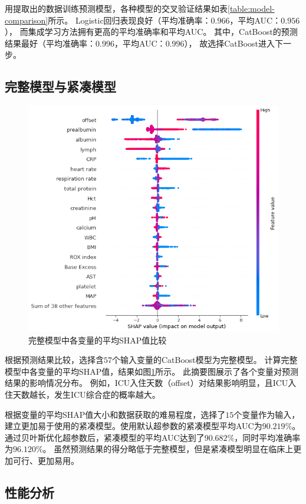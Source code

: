 用提取出的数据训练预测模型，各种模型的交叉验证结果如表\ref{table:model-comparison}所示。%
Logistic回归表现良好（平均准确率：$0.966$，平均AUC：$0.956$），%
而集成学习方法拥有更高的平均准确率和平均AUC。%
其中，CatBoost的预测结果最好（平均准确率：$0.996$，平均AUC：$0.996$），%
故选择CatBoost进入下一步。

\subsection{完整模型与紧凑模型}

\begin{figure}[htbp]
    \centering
    \includegraphics[width=0.9\linewidth]{../img/eicu_full_shap_beeswarm_20.png}
    \caption{完整模型中各变量的平均SHAP值比较}
    \label{figure:full-shap}
\end{figure}

根据预测结果比较，选择含$57$个输入变量的CatBoost模型为完整模型。%
计算完整模型中各变量的平均SHAP值，结果如图\ref{figure:full-shap}所示。%
此摘要图展示了各个变量对预测结果的影响情况分布。%
例如，ICU入住天数（offset）对结果影响明显，且ICU入住天数越长，发生ICU综合症的概率越大。

根据变量的平均SHAP值大小和数据获取的难易程度，选择了$15$个变量作为输入，%
建立更加易于使用的紧凑模型。使用默认超参数的紧凑模型平均AUC为$90.219\%$。%
通过贝叶斯优化超参数后，紧凑模型的平均AUC达到了$90.682\%$，同时平均准确率为$96.120\%$。%
虽然预测结果的得分略低于完整模型，但是紧凑模型明显在临床上更加可行、更加易用。

\subsection{性能分析}

